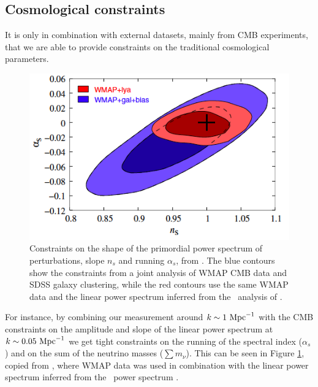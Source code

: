 \subsection{Cosmological constraints}

It is only in combination with external datasets, mainly from CMB experiments,
that we are able to provide constraints on the traditional cosmological
parameters.

\begin{figure}[h]
 \begin{center}
  \includegraphics[scale=0.6]{Figures/Seljak2005_contour2D}
 \end{center}
 \caption{Constraints on the shape of the primordial power spectrum of
  perturbations, slope $n_s$ and running $\alpha_s$, from \cite{Seljak2005}.
  The blue contours show the constraints from a joint analysis of WMAP CMB
  data and SDSS galaxy clustering, while the red contours use the same WMAP
  data and the linear power spectrum inferred from the \lya\ analysis of
  \cite{McDonald2005a}.
 }
 \label{fig:Seljak2005}
\end{figure}

For instance, by combining our measurement around $k \sim 1 \ \text{Mpc}^{-1}$ with the CMB
constraints on the amplitude and slope of the linear power spectrum at
$k \sim 0.05 \ \text{Mpc}^{-1}$ we get tight constraints on the running of the spectral
index ($\alpha_s$) and on the sum of the neutrino masses ($\sum m_\nu$).
This can be seen in Figure \ref{fig:Seljak2005}, copied from \cite{Seljak2005},
where WMAP data was used in combination with the linear power spectrum
inferred from the \lya\ power spectrum \cite{McDonald2005a}.

